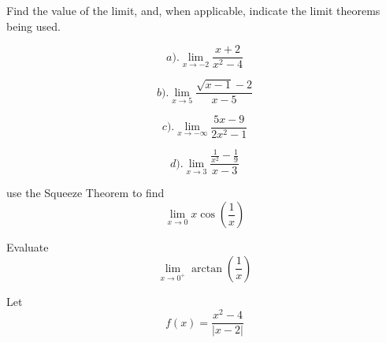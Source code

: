 \documentclass[11pt]{exam}
\begin{document}
\begin{questions}
\vfill









\addpoints
\question[24] 
Find the value of the limit, and, when applicable, indicate the limit theorems being used.  %

\begin{minipage}{.3\linewidth}
\begin{equation*}
a).   \lim_{x\to -2} \frac{x+2}{x^{2}-4}
\end{equation*}
\end{minipage}%
\begin{minipage}{.7\linewidth}
\begin{equation*}
b).   \lim_{x\to 5} \frac{\sqrt{x-1}-2}{x-5}
\end{equation*}
\end{minipage}

\vfill\vfill

\begin{minipage}{.3\linewidth}
\begin{equation*}
c).   \lim_{x\to -\infty} \frac{5x-9}{2x^{2}-1}
\end{equation*}
\end{minipage}%
\begin{minipage}{.7\linewidth}
\begin{equation*}
d).   \lim_{x\to 3} \frac{\frac{1}{x^{2}}-\frac{1}{9}}{x-3}
\end{equation*}
\end{minipage}

\vfill\vfill











\newpage
\addpoints
\question[10] use the Squeeze Theorem to find 
\[ 
\lim_{x\to 0} x\cos{\left(\frac{1}{x}\right)}
\]
\vfill

\question[10] 
Evaluate 
\[ 
\lim_{x\to 0^{+}} \arctan{\left(\frac{1}{x}\right)}
\]
\vfill

\newpage
\addpoints

\addpoints
\question[15] 
Let 
\[
f(x)=\frac{x^{2}-4}{|x-2|}
\]


\end{questions}
\end{document}
